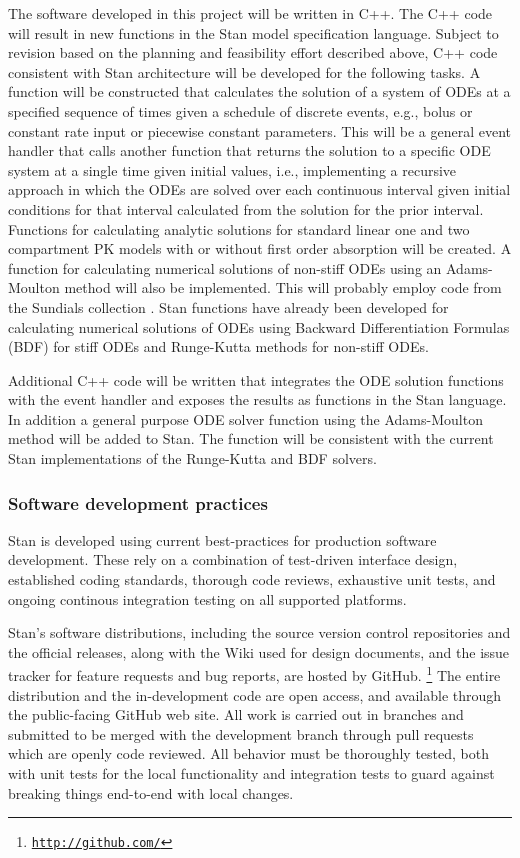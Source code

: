 \documentclass[11pt]{nih2016}
\newcommand{\myurl}[1]{\href{#1}{{\tt #1}}}%
\begin{document}
The software developed in this project will be written in C++. The C++
code will result in new functions in the Stan model specification
language. Subject to revision based on the planning and feasibility
effort described above, C++ code consistent with Stan architecture
will be developed for the following tasks. A function will be
constructed that calculates the solution of a system of ODEs at a
specified sequence of times given a schedule of discrete events, e.g.,
bolus or constant rate input or piecewise constant parameters. This
will be a general event handler that calls another function that
returns the solution to a specific ODE system at a single time given
initial values, i.e., implementing a recursive approach in which the
ODEs are solved over each continuous interval given initial conditions
for that interval calculated from the solution for the prior
interval. Functions for calculating analytic solutions for standard
linear one and two compartment PK models with or without first order
absorption will be created.  A function for calculating numerical
solutions of non-stiff ODEs using an Adams-Moulton method will also be
implemented. This will probably employ code from the Sundials
collection \citep{hindmarsh-et-al:2005}. Stan functions have already
been developed for calculating numerical solutions of ODEs using
Backward Differentiation Formulas (BDF) for stiff ODEs and Runge-Kutta
methods for non-stiff ODEs.

Additional C++ code will be written that integrates the ODE solution
functions with the event handler and exposes the results as functions
in the Stan language. In addition a general purpose ODE solver
function using the Adams-Moulton method will be added to Stan. The function
will be consistent with the current Stan implementations of the
Runge-Kutta and BDF solvers.

\subsubsection{Software development practices}

Stan is developed using current best-practices for production software
development.  These rely on a combination of test-driven interface
design, established coding standards, thorough code reviews,
exhaustive unit tests, and ongoing continous integration testing
on all supported platforms.

Stan's software distributions, including the source version control
repositories and the official releases, along with the Wiki used for
design documents, and the issue tracker for feature requests and bug
reports, are hosted by GitHub.%
%
\footnote{\myurl{http://github.com/}}
%
The entire distribution and the in-development code are open access,
and available through the public-facing GitHub web site.  All work is
carried out in branches and submitted to be merged with the
development branch through pull requests which are openly code
reviewed.  All behavior must be thoroughly tested, both with unit
tests for the local functionality and integration tests to guard
against breaking things end-to-end with local changes.
\end{document}
